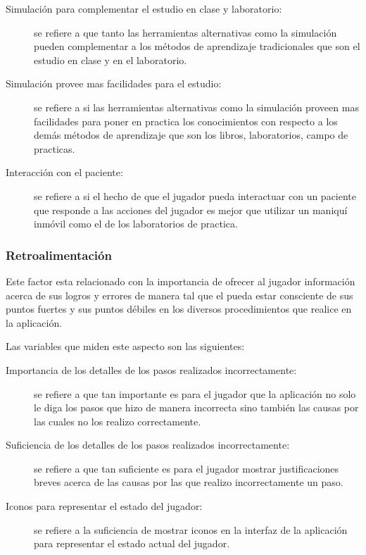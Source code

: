 \begin{description}

\item[Simulación para complementar el estudio en clase y laboratorio:] se
    refiere a que tanto las herramientas alternativas como la simulación pueden
    complementar a los métodos de aprendizaje tradicionales que son el estudio
    en clase y en el laboratorio.

\item[Simulación provee mas facilidades para el estudio:] se refiere a si las
    herramientas alternativas como la simulación proveen mas facilidades para
    poner en practica los conocimientos con respecto a los demás métodos de
    aprendizaje que son los libros, laboratorios,  campo de practicas.

\item[Interacción con el paciente:] se refiere a si el hecho de que el jugador
    pueda interactuar con un paciente que responde a las acciones del jugador es
    mejor que utilizar un maniquí inmóvil como el de los laboratorios de
    practica.

\end{description}

\subsubsection{Retroalimentación}

Este factor esta relacionado con la importancia de ofrecer al jugador
información acerca de sus logros y errores de manera tal que el pueda estar
consciente de sus puntos fuertes y sus puntos débiles en los diversos
procedimientos que realice en la aplicación.

Las variables que miden este aspecto son las siguientes:

\begin{description}

\item[Importancia de los detalles de los pasos realizados incorrectamente:] se
    refiere a que tan importante es para el jugador que la aplicación no solo le
    diga los pasos que hizo de manera incorrecta sino también las causas por las
    cuales no los realizo correctamente.

\item[Suficiencia de los detalles de los pasos realizados incorrectamente:]se
    refiere a que tan suficiente es para el jugador mostrar justificaciones
    breves acerca de las causas por las que realizo incorrectamente un paso.

\item[Iconos para representar el estado del jugador:] se refiere a la
    suficiencia de mostrar iconos en la interfaz de la aplicación para
    representar el estado actual del jugador.

\end{description}

